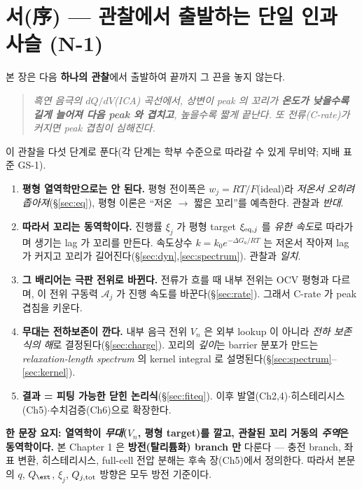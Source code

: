 
\section*{서(序) — 관찰에서 출발하는 단일 인과 사슬 (N-1)}
본 장은 다음 \textbf{하나의 관찰}에서 출발하여 끝까지 그 끈을 놓지 않는다.
\begin{quote}\itshape
흑연 음극의 $dQ/dV$(ICA) 곡선에서, 상변이 peak 의 꼬리가 \textbf{온도가 낮을수록 길게 늘어져 다음
peak 와 겹치고}, 높을수록 짧게 끝난다. 또 전류(C-rate)가 커지면 peak 겹침이 심해진다.
\end{quote}
이 관찰을 다섯 단계로 푼다(각 단계는 학부 수준으로 따라갈 수 있게 무비약; 지배 표준 GS-1).
\begin{enumerate}[label=(\arabic*),leftmargin=2.0em]
\item \textbf{평형 열역학만으로는 안 된다.} 평형 전이폭은 $w_j=RT/F$(ideal)라 \emph{저온서 오히려
  좁아져}(\S\ref{sec:eq}), 평형 이론은 ``저온 $\to$ 짧은 꼬리''를 예측한다. 관찰과 \emph{반대}.
\item \textbf{따라서 꼬리는 동역학이다.} 진행률 $\xi_j$ 가 평형 target $\xi_{\mathrm{eq},j}$ 를 \emph{유한
  속도}로 따라가며 생기는 lag 가 꼬리를 만든다. 속도상수 $k=k_0e^{-\Delta G_a/RT}$ 는 저온서 작아져
  lag 가 커지고 꼬리가 길어진다(\S\ref{sec:dyn},\ref{sec:spectrum}). 관찰과 \emph{일치}.
\item \textbf{그 배리어는 극판 전위로 바뀐다.} 전류가 흐를 때 내부 전위는 OCV 평형과 다르며, 이
  전위 구동력 $\mathcal A_j$ 가 진행 속도를 바꾼다(\S\ref{sec:rate}). 그래서 C-rate 가 peak 겹침을 키운다.
\item \textbf{무대는 전하보존이 깐다.} 내부 음극 전위 $V_n$ 은 외부 lookup 이 아니라 \emph{전하 보존식의
  해}로 결정된다(\S\ref{sec:charge}). 꼬리의 \emph{깊이}는 barrier 분포가 만드는 \emph{relaxation-length
  spectrum} 의 kernel integral 로 설명된다(\S\ref{sec:spectrum}--\ref{sec:kernel}).
\item \textbf{결과 = 피팅 가능한 닫힌 논리식}(\S\ref{sec:fiteq}). 이후 발열(Ch2,4)$\cdot$히스테리시스
  (Ch5)$\cdot$수치검증(Ch6)으로 확장한다.
\end{enumerate}
\noindent\textbf{한 문장 요지: 열역학이 \emph{무대}($V_n$, 평형 target)를 깔고, 관찰된 꼬리 거동의
\emph{주역}은 동역학이다.} 본 Chapter 1 은 \textbf{방전(탈리튬화) branch 만} 다룬다 — 충전 branch,
좌표 변환, 히스테리시스, full-cell 전압 분해는 후속 장(Ch5)에서 정의한다. 따라서 본문의 $q$,
$Q_\ext$, $\xi_j$, $Q_{j,\mathrm{tot}}$ 방향은 모두 방전 기준이다.

